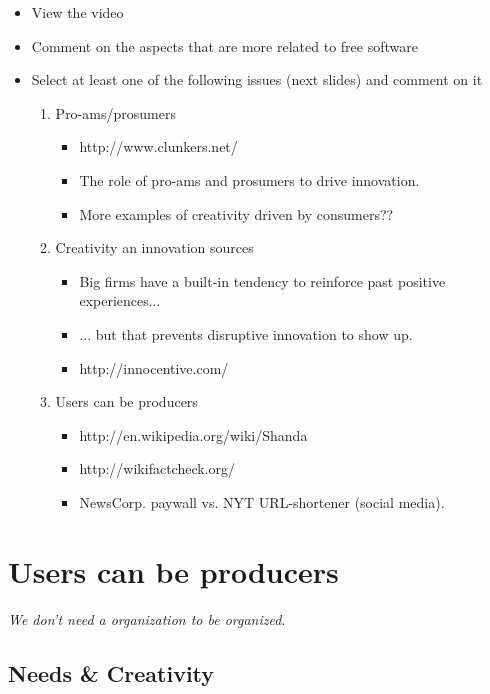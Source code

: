 \documentclass[11pt]{scrartcl}
\begin{document}
\begin{itemize}
	\item View the video
    \item Comment on the aspects that are more related to free software
    \item Select at least one of the following issues (next slides) and comment on it
    \begin{enumerate}
	    \item Pro-ams/prosumers
	    \begin{itemize}
        	\item http://www.clunkers.net/
        	\item The role of pro-ams and prosumers to drive innovation.
        	\item More examples of creativity driven by consumers??
        \end{itemize}
        \item Creativity an innovation sources
        \begin{itemize}
	        \item Big firms have a built-in tendency to reinforce past positive experiences...
	        \item ... but that prevents disruptive innovation to show up.
	        \item http://innocentive.com/
        \end{itemize}
        \item Users can be producers
        \begin{itemize}
	        \item http://en.wikipedia.org/wiki/Shanda
	        \item http://wikifactcheck.org/
	        \item NewsCorp. paywall vs. NYT URL-shortener (social media).
        \end{itemize}
    \end{enumerate}
\end{itemize}

\section{Users can be producers}

\emph{We don't need a organization to be organized}\cite{charles-innovation}.

\subsection{Needs \& Creativity}
\end{document}
